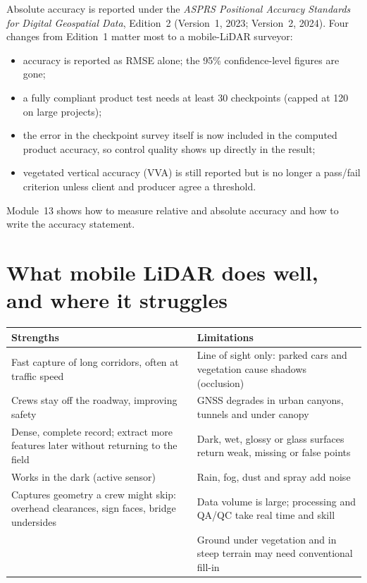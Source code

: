 Absolute accuracy is reported under the \emph{ASPRS Positional Accuracy Standards for Digital Geospatial Data}, Edition~2 (Version~1, 2023; Version~2, 2024). Four changes from Edition~1 matter most to a mobile-LiDAR surveyor:
\begin{itemize}
\item accuracy is reported as RMSE alone; the 95\% confidence-level figures are gone;
\item a fully compliant product test needs at least 30 checkpoints (capped at 120 on large projects);
\item the error in the checkpoint survey itself is now included in the computed product accuracy, so control quality shows up directly in the result;
\item vegetated vertical accuracy (VVA) is still reported but is no longer a pass/fail criterion unless client and producer agree a threshold.
\end{itemize}
Module~13 shows how to measure relative and absolute accuracy and how to write the accuracy statement.

\section{What mobile LiDAR does well, and where it struggles}

\begin{center}\small
\renewcommand{\arraystretch}{1.2}
\begin{tabularx}{\linewidth}{XX}
\toprule
\textbf{Strengths} & \textbf{Limitations}\\ \midrule
Fast capture of long corridors, often at traffic speed & Line of sight only: parked cars and vegetation cause shadows (occlusion)\\
Crews stay off the roadway, improving safety & GNSS degrades in urban canyons, tunnels and under canopy\\
Dense, complete record; extract more features later without returning to the field & Dark, wet, glossy or glass surfaces return weak, missing or false points\\
Works in the dark (active sensor) & Rain, fog, dust and spray add noise\\
Captures geometry a crew might skip: overhead clearances, sign faces, bridge undersides & Data volume is large; processing and QA/QC take real time and skill\\
& Ground under vegetation and in steep terrain may need conventional fill-in\\
\bottomrule
\end{tabularx}
\end{center}

